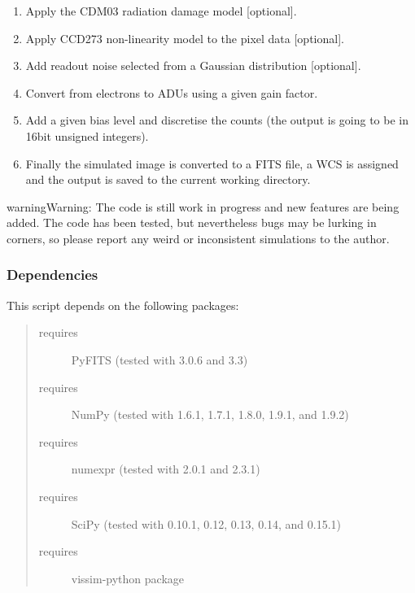 \documentclass[a4paper,11pt,english]{sphinxmanual}
\begin{document}
\begin{enumerate}
\item {} 
Apply the CDM03 radiation damage model {[}optional{]}.

\item {} 
Apply CCD273 non-linearity model to the pixel data {[}optional{]}.

\item {} 
Add readout noise selected from a Gaussian distribution {[}optional{]}.

\item {} 
Convert from electrons to ADUs using a given gain factor.

\item {} 
Add a given bias level and discretise the counts (the output is going to be in 16bit unsigned integers).

\item {} 
Finally the simulated image is converted to a FITS file, a WCS is assigned
and the output is saved to the current working directory.

\end{enumerate}

\begin{notice}{warning}{Warning:}
The code is still work in progress and new features are being added.
The code has been tested, but nevertheless bugs may be lurking in corners, so
please report any weird or inconsistent simulations to the author.
\end{notice}


\subsubsection{Dependencies}
\label{simulator:dependencies}
This script depends on the following packages:
\begin{quote}\begin{description}
\item[{requires}] \leavevmode
PyFITS (tested with 3.0.6 and 3.3)

\item[{requires}] \leavevmode
NumPy (tested with 1.6.1, 1.7.1, 1.8.0, 1.9.1, and 1.9.2)

\item[{requires}] \leavevmode
numexpr (tested with 2.0.1 and 2.3.1)

\item[{requires}] \leavevmode
SciPy (tested with 0.10.1, 0.12, 0.13, 0.14, and 0.15.1)

\item[{requires}] \leavevmode
vissim-python package

\end{description}\end{quote}
\end{document}
